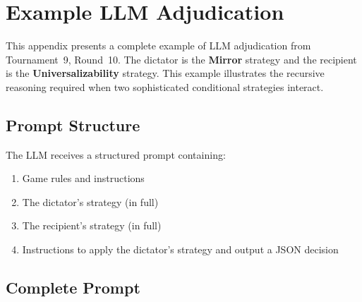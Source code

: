 \appendix

\section{Example LLM Adjudication}
\label{sec:appendix-example}

This appendix presents a complete example of LLM adjudication from Tournament~9, Round~10.
The dictator is the \textbf{Mirror} strategy and the recipient is the \textbf{Universalizability} strategy.
This example illustrates the recursive reasoning required when two sophisticated conditional strategies interact.

\subsection{Prompt Structure}

The LLM receives a structured prompt containing:
\begin{enumerate}
  \item Game rules and instructions
  \item The dictator's strategy (in full)
  \item The recipient's strategy (in full)
  \item Instructions to apply the dictator's strategy and output a JSON decision
\end{enumerate}

\subsection{Complete Prompt}

